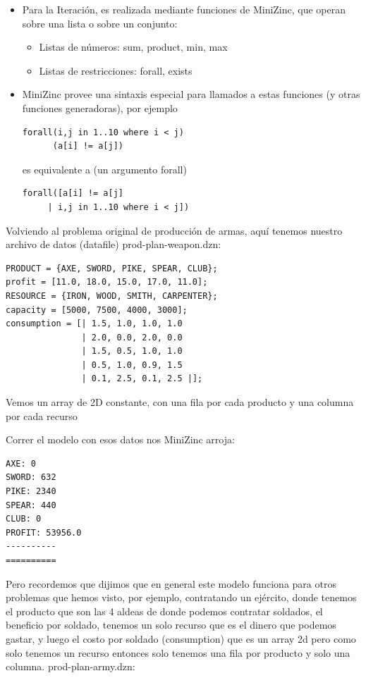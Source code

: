 \documentclass[12pt]{article}
\begin{document}
\begin{itemize}
\item Para la Iteración, es realizada mediante funciones de MiniZinc, que operan sobre una lista o sobre un conjunto:
\begin{itemize}
\item Listas de números: sum, product, min, max
\item Listas de restricciones: forall, exists
\end{itemize}
\item MiniZinc provee una sintaxis especial para llamados a estas funciones (y otras funciones generadoras), por ejemplo
\begin{Verbatim}
forall(i,j in 1..10 where i < j)
      (a[i] != a[j])
\end{Verbatim}
es equivalente a (un argumento forall)
\begin{Verbatim}
forall([a[i] != a[j]
     | i,j in 1..10 where i < j])
\end{Verbatim}
\end{itemize}

\begin{justify}
Volviendo al problema original de producción de armas, aquí tenemos nuestro archivo de datos (datafile) prod-plan-weapon.dzn:
\end{justify}

\begin{Verbatim}
PRODUCT = {AXE, SWORD, PIKE, SPEAR, CLUB};
profit = [11.0, 18.0, 15.0, 17.0, 11.0];
RESOURCE = {IRON, WOOD, SMITH, CARPENTER};
capacity = [5000, 7500, 4000, 3000];
consumption = [| 1.5, 1.0, 1.0, 1.0
               | 2.0, 0.0, 2.0, 0.0
               | 1.5, 0.5, 1.0, 1.0
               | 0.5, 1.0, 0.9, 1.5
               | 0.1, 2.5, 0.1, 2.5 |];
\end{Verbatim}

\begin{justify}
Vemos un array de 2D constante, con una fila por cada producto y una columna por cada recurso
\end{justify}

\begin{justify}
Correr el modelo con esos datos nos MiniZinc arroja:
\end{justify}

\begin{Verbatim}
AXE: 0
SWORD: 632
PIKE: 2340
SPEAR: 440
CLUB: 0
PROFIT: 53956.0
----------
==========
\end{Verbatim}

\begin{justify}
Pero recordemos que dijimos que en general este modelo funciona para otros problemas que hemos visto, por ejemplo, contratando un ejército, donde tenemos el producto que son las 4 aldeas de donde podemos contratar soldados, el beneficio por soldado, tenemos un solo recurso que es el dinero que podemos gastar, y luego el costo por soldado (consumption) que es un array 2d pero como solo tenemos un recurso entonces solo tenemos una fila por producto y solo una columna. prod-plan-army.dzn:
\end{justify}
\end{document}
